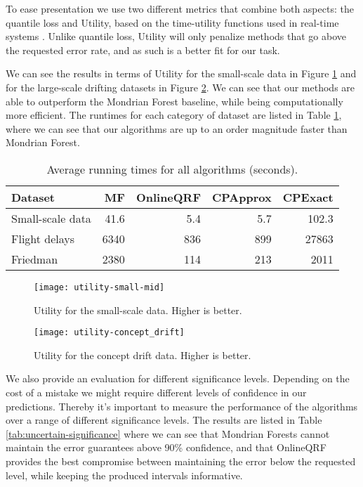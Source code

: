To ease presentation we use two different metrics that
combine both aspects: the quantile loss \cite{koenker2005qr} and Utility,
based on the time-utility functions used in real-time systems \cite{tuf2005}.
Unlike quantile loss, Utility will only penalize methods that go above
the requested error rate, and as such is a better fit for our task.

We can see the results in terms of Utility for the small-scale data in Figure \ref{fig:utility-small-mid}
and for the large-scale drifting datasets in Figure \ref{fig:utility-concept-drift}.
We can see that our methods are able to outperform the Mondrian Forest baseline,
while being computationally more efficient. The runtimes for each
category of dataset are listed in Table \ref{tab:uncertain-runtimes}, where we
can see that our algorithms are up to an order magnitude faster
than Mondrian Forest.

\begin{table}
	\centering
	\begin{tabular}{l r r r r}
		\toprule
		Dataset      & MF  & OnlineQRF & CPApprox & CPExact  \\
		\midrule
		Small-scale data & 41.6       & 5.4     & 5.7      & 102.3        \\
		Flight delays   & 6340        & 836       & 899       & 27863        \\
		Friedman     & 2380      & 114      & 213      & 2011            \\
		\bottomrule
	\end{tabular}
	\caption{Average running times for all algorithms (seconds).}
	\label{tab:uncertain-runtimes}
\end{table}



\begin{figure}
	\centering
	\texttt{[image: utility-small-mid]}
	\caption{Utility for the small-scale data. Higher is better.}
	\label{fig:utility-small-mid}
\end{figure}

\begin{figure}
	\centering
	\texttt{[image: utility-concept\_drift]}
	\caption{Utility for the concept drift data. Higher is better.}
	\label{fig:utility-concept-drift}
\end{figure}

We also provide an evaluation for different significance levels.
Depending on the cost of a mistake we might require different levels of confidence
in our predictions. Thereby it's important to measure the performance of the 
algorithms over a range of different significance levels. The results are listed
in Table \ref{tab:uncertain-significance} where we can see that Mondrian Forests cannot maintain the
error guarantees above 90\% confidence, and that OnlineQRF provides the best
compromise between maintaining the error below the requested level, while
keeping the produced intervals informative.

